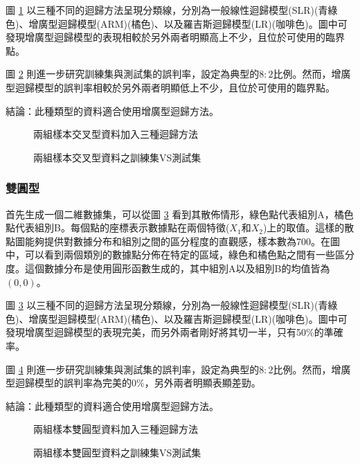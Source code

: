 圖 \ref{fig:rdn14-LARline} 以三種不同的迴歸方法呈現分類線，分別為一般線性迴歸模型(SLR)(青綠色)、增廣型迴歸模型(ARM)(橘色)、以及羅吉斯迴歸模型(LR)(咖啡色)。圖中可發現增廣型迴歸模型的表現相較於另外兩者明顯高上不少，且位於可使用的臨界點。

圖 \ref{fig:rdn14-LARline2} 則進一步研究訓練集與測試集的誤判率，設定為典型的$8:2$比例。然而，增廣型迴歸模型的誤判率相較於另外兩者明顯低上不少，且位於可使用的臨界點。

結論：此種類型的資料適合使用增廣型迴歸方法。
\begin{figure}[h]
    \caption{兩組樣本交叉型資料加入三種迴歸方法}
    \label{fig:rdn14-LARline}
\end{figure}
\begin{figure}[h]
    \caption{兩組樣本交叉型資料之訓練集VS測試集}
    \label{fig:rdn14-LARline2}
\end{figure}
\subsubsection{雙圓型}
首先生成一個二維數據集，可以從圖 \ref{fig:rdn15-LARline} 看到其散佈情形，綠色點代表組別A，橘色點代表組別B。每個點的座標表示數據點在兩個特徵($X_1$和$X_2$)上的取值。這樣的散點圖能夠提供對數據分布和組別之間的區分程度的直觀感，樣本數為700。在圖中，可以看到兩個類別的數據點分佈在特定的區域，綠色和橘色點之間有一些區分度。這個數據分布是使用圓形函數生成的，其中組別A以及組別B的均值皆為$(0,0)$。

圖 \ref{fig:rdn15-LARline} 以三種不同的迴歸方法呈現分類線，分別為一般線性迴歸模型(SLR)(青綠色)、增廣型迴歸模型(ARM)(橘色)、以及羅吉斯迴歸模型(LR)(咖啡色)。圖中可發現增廣型迴歸模型的表現完美，而另外兩者剛好將其切一半，只有50\%的準確率。

圖 \ref{fig:rdn15-LARline2} 則進一步研究訓練集與測試集的誤判率，設定為典型的$8:2$比例。然而，增廣型迴歸模型的誤判率為完美的0\%，另外兩者明顯表顯差勁。

結論：此種類型的資料適合使用增廣型迴歸方法。
\begin{figure}[H]
    \caption{兩組樣本雙圓型資料加入三種迴歸方法}
    \label{fig:rdn15-LARline}
\end{figure}
\begin{figure}[H]
    \caption{兩組樣本雙圓型資料之訓練集VS測試集}
    \label{fig:rdn15-LARline2}
\end{figure}
